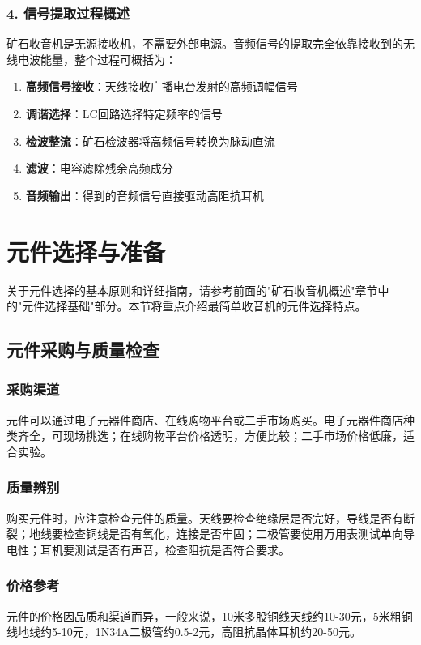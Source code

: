 \documentclass[12pt,UTF8]{ctexbook}
\begin{document}
\subsubsection{4. 信号提取过程概述}

矿石收音机是无源接收机，不需要外部电源。音频信号的提取完全依靠接收到的无线电波能量，整个过程可概括为：

\begin{enumerate}[leftmargin=3.5em]
    \item \textbf{高频信号接收}：天线接收广播电台发射的高频调幅信号
    \item \textbf{调谐选择}：LC回路选择特定频率的信号
    \item \textbf{检波整流}：矿石检波器将高频信号转换为脉动直流
    \item \textbf{滤波}：电容滤除残余高频成分
    \item \textbf{音频输出}：得到的音频信号直接驱动高阻抗耳机
\end{enumerate}

\section{元件选择与准备}

关于元件选择的基本原则和详细指南，请参考前面的"矿石收音机概述"章节中的"元件选择基础"部分。本节将重点介绍最简单收音机的元件选择特点。

\subsection{元件采购与质量检查}

\subsubsection{采购渠道}
元件可以通过电子元器件商店、在线购物平台或二手市场购买。电子元器件商店种类齐全，可现场挑选；在线购物平台价格透明，方便比较；二手市场价格低廉，适合实验。

\subsubsection{质量辨别}
购买元件时，应注意检查元件的质量。天线要检查绝缘层是否完好，导线是否有断裂；地线要检查铜线是否有氧化，连接是否牢固；二极管要使用万用表测试单向导电性；耳机要测试是否有声音，检查阻抗是否符合要求。

\subsubsection{价格参考}
元件的价格因品质和渠道而异，一般来说，10米多股铜线天线约10-30元，5米粗铜线地线约5-10元，1N34A二极管约0.5-2元，高阻抗晶体耳机约20-50元。
\end{document}
